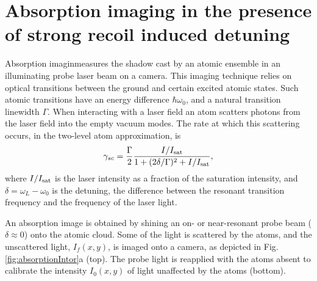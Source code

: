 \documentclass[12pt]{iopart}
\begin{document}
\section{Absorption imaging in the presence of strong recoil induced detuning}
\label{sec:2}
Absorption imaginmeasures the shadow cast by an atomic ensemble in an illuminating probe laser beam on a camera. This imaging technique relies on optical transitions between the ground and certain excited atomic states. Such atomic transitions have an energy difference $\hbar\omega_0$, and a natural transition linewidth $\Gamma$. When interacting with a laser field an atom scatters photons from the laser field into the empty vacuum modes. The  rate at which this scattering occurs, in the two-level atom approximation, is \cite{LCT}
\begin{equation}
\gamma_{sc}= \frac{\Gamma}{2} \frac{I/I_{\rm{sat}}}{1+(2\delta/\Gamma)^2 +I/I_{\rm{sat}}}, 
\label{eq:scatrate}
\end{equation}
where $I/I_{\rm{sat}}$ is the laser intensity as a fraction of the saturation intensity, and $\delta=\omega_L-\omega_0$ is the detuning, the difference between the resonant transition frequency and the frequency of the laser light.  
\par An absorption image is obtained by shining an on- or near-resonant probe beam ($\delta\approx0$) onto the atomic cloud. Some of the light is scattered by the atoms, and the unscattered light, $I_f(x,y)$, is imaged onto a camera, as depicted in Fig. \ref{fig:absorptionIntor}a (top). The probe light is reapplied with the atoms absent to calibrate the intensity $I_0(x,y)$ of light unaffected by the atoms (bottom). 
\end{document}

